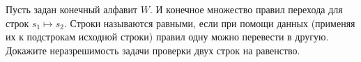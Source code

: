 Пусть задан конечный алфавит $W$. И конечное множество правил перехода для строк $s_1 \mapsto
s_2$. Строки называются равными, если при помощи данных (применяя их к подстрокам исходной строки) правил
одну можно перевести в другую. Докажите неразрешимость задачи проверки двух строк на равенство.
